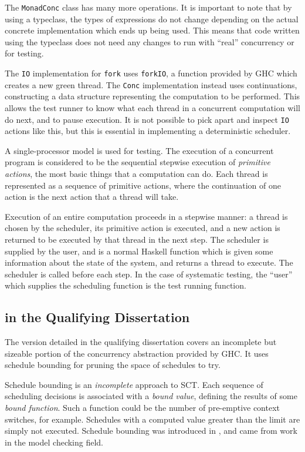 The \verb|MonadConc| class has many more operations. It is important
to note that by using a typeclass, the types of expressions do not
change depending on the actual concrete implementation which ends up
being used. This means that code written using the typeclass does not
need any changes to run with ``real'' concurrency or for testing.

The \verb|IO| implementation for \verb|fork| uses \verb|forkIO|, a
function provided by GHC which creates a new green thread. The
\verb|Conc| implementation instead uses continuations, constructing a
data structure representing the computation to be performed. This
allows the test runner to know what each thread in a concurrent
computation will do next, and to pause execution. It is not possible
to pick apart and inspect \verb|IO| actions like this, but this is
essential in implementing a deterministic scheduler.

A single-processor model is used for testing. The execution of a
concurrent program is considered to be the sequential stepwise
execution of \emph{primitive actions}, the most basic things that a
computation can do. Each thread is represented as a sequence of
primitive actions, where the continuation of one action is the next
action that a thread will take.

Execution of an entire computation proceeds in a stepwise manner: a
thread is chosen by the scheduler, its primitive action is executed,
and a new action is returned to be executed by that thread in the next
step. The scheduler is supplied by the user, and is a normal Haskell
function which is given some information about the state of the
system, and returns a thread to execute. The scheduler is called
before each step. In the case of systematic testing, the ``user''
which supplies the scheduling function is the test running function.

\subsection{\dejafu{} in the Qualifying Dissertation}
\label{sec:progress-dejafu-old}

The version detailed in the qualifying dissertation covers an
incomplete but sizeable portion of the concurrency abstraction
provided by GHC. It uses schedule bounding for pruning the space of
schedules to try.

Schedule bounding is an \emph{incomplete} approach to SCT. Each
sequence of scheduling decisions is associated with a \emph{bound
  value}, defining the results of some \emph{bound function}. Such a
function could be the number of pre-emptive context switches, for
example. Schedules with a computed value greater than the limit are
simply not executed. Schedule bounding was introduced in
\citep{pbound}, and came from work in the model checking field.

